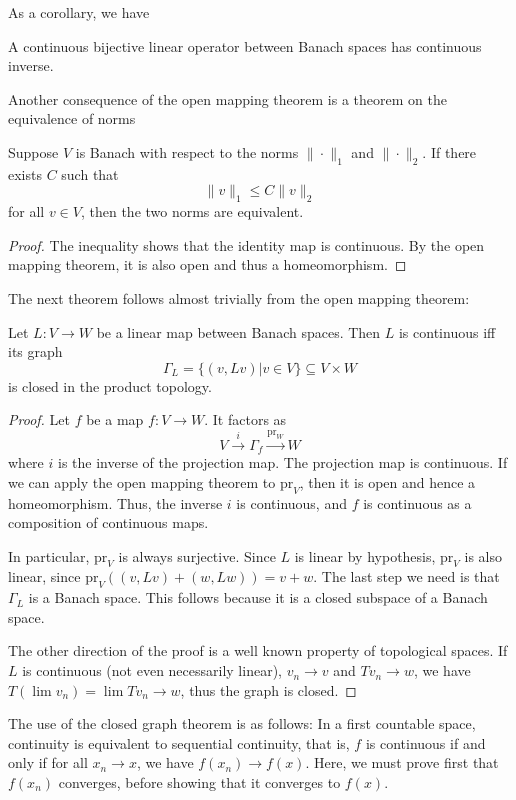 \documentclass[twoside,symmetric, openany, 12pt]{./tuftebook}
\theoremstyle{definition}
\theoremstyle{definition}
\theoremstyle{definition}
\begin{document}
As a corollary, we have
\begin{Corollary}
	A continuous bijective linear operator between Banach spaces has continuous inverse.
\end{Corollary}
Another consequence of the open mapping theorem is a theorem on the equivalence of norms
\begin{Corollary}
	Suppose $V$ is Banach with respect to the norms $\|\cdot\|_1$ and $\|\cdot\|_2$. If there exists $C$ such that
	\[\|v\|_1 \le C \|v\|_2\]
	for all $v\in V$, then the two norms are equivalent.
\end{Corollary}
\begin{proof}
	The inequality shows that the identity map is continuous. By the open mapping theorem, it is also open and thus a homeomorphism.
\end{proof}

The next theorem follows almost trivially from the open mapping theorem:
\begin{Theorem}
	Let $L:V\to W$ be a linear map between Banach spaces. Then $L$ is continuous iff its graph
	\[\Gamma_L=\{(v, Lv)|v\in V\}\subseteq V\times W\]
	is closed in the product topology. 
\end{Theorem}
\begin{proof}
	Let $f$ be a map $f:V\to W$. It factors as
	\[V \xrightarrow{i} \Gamma_f \xrightarrow{\text{pr}_W} W\]
	where $i$ is the inverse of the projection map. The projection map is continuous. If we can apply the open mapping theorem to $\text{pr}_V$, then it is open and hence a homeomorphism. Thus, the inverse $i$ is continuous, and $f$ is continuous as a composition of continuous maps. 
	
	In particular, $\text{pr}_V$ is always surjective. Since $L$ is linear by hypothesis, $\text{pr}_V$ is also linear, since $\text{pr}_V((v, Lv) + (w, Lw)) = v + w$. The last step we need is that $\Gamma_L$ is a Banach space. This follows because it is a closed subspace of a Banach space.
	
	The other direction of the proof is a well known property of topological spaces. If $L$ is continuous (not even necessarily linear), $v_n \to v$ and $Tv_n \to w$, we have $T (\lim v_n)= \lim Tv_n \to w$, thus the graph is closed. 
\end{proof}
The use of the closed graph theorem is as follows: In a first countable space, continuity is equivalent to sequential continuity, that is, $f$ is continuous if and only if for all $x_n\to x$, we have $f(x_n) \to f(x)$. Here, we must prove first that $f(x_n)$ converges, before showing that it converges to $f(x)$.
\end{document}
